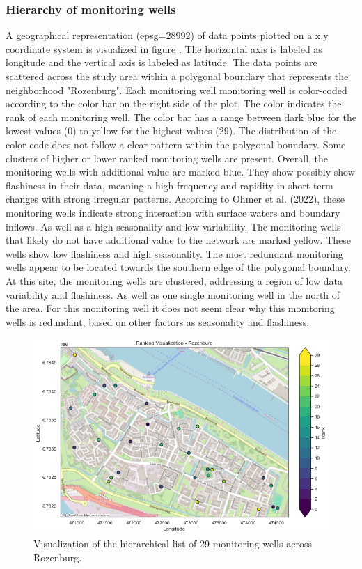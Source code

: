 \subsubsection{Hierarchy of monitoring wells}
A geographical representation (epsg=28992) of data points plotted on a x,y coordinate system is visualized in figure . The horizontal axis is labeled as longitude and the vertical axis is labeled as latitude. The data points are scattered across the study area within a polygonal boundary that represents the neighborhood "Rozenburg". Each monitoring well monitoring well is color-coded according to the color bar on the right side of the plot. The color indicates the rank of each monitoring well. The color bar has a range between dark blue for the lowest values (0) to yellow for the highest values (29). The distribution of the color code does not follow a clear pattern within the polygonal boundary. Some clusters of higher or lower ranked monitoring wells are present. Overall, the monitoring wells with additional value are marked blue. They show possibly show flashiness in their data, meaning a high frequency and rapidity in short term changes with strong irregular patterns. According to Ohmer et al. (2022), these monitoring wells indicate strong interaction with surface waters and boundary inflows. As well as a high seasonality and low variability. The monitoring wells that likely do not have additional value to the network are marked yellow. These wells show low flashiness and high seasonality. The most redundant monitoring wells appear to be located towards the southern edge of the polygonal boundary. At this site, the monitoring wells are clustered, addressing a region of low data variability and flashiness. As well as one single monitoring well in the north of the area. For this monitoring well it does not seem clear why this monitoring wells is redundant, based on other factors as seasonality and flashiness. 

\begin{figure}[h]
    \centering
    \includegraphics[width=0.8\linewidth]{frontmatter/Rozenburg-fig/rankroz.png}
    \caption{Visualization of the hierarchical list of 29 monitoring wells across Rozenburg.}
    \label{rankroz}
\end{figure} 

